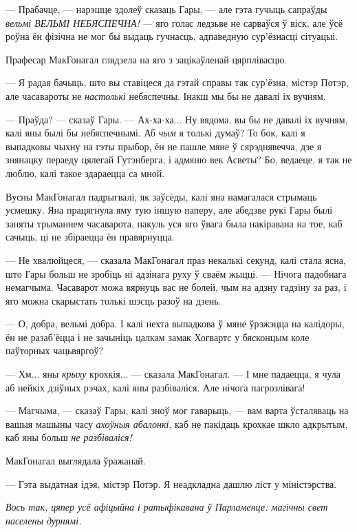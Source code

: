 --- Прабачце, --- нарэшце здолеў сказаць Гары, --- але гэта гучыць сапраўды 
\emph{вельмі ВЕЛЬМІ НЕБЯСПЕЧНА!} --- яго голас ледзьве не сарваўся ў віск, але ўсё роўна
ён фізічна не мог бы выдаць гучнасць, адпаведную сур'ёзнасці сітуацыі.

Прафесар МакГонагал глядзела на яго з зацікаўленай цярплівасцю.

--- Я радая бачыць, што вы ставіцеся да гэтай справы так сур'ёзна, містэр Потэр,
але часавароты не  \emph{настолькі} небяспечны. Інакш мы бы не давалі іх вучням.

--- Праўда? --- сказаў Гары. --- Ах-ха-ха... Ну вядома, вы бы не давалі іх вучням,
калі яны былі бы небяспечнымі. Аб \emph{чым} я толькі думаў? То бок, калі я выпадковы чыхну на 
гэты прыбор, ён не пашле мяне ў сярэднявечча, дзе я знянацку пераеду цялегай Гутэнберга,
і адмяню век Асветы? Бо, ведаеце, я так не люблю, калі такое здараецца са мной.

Вусны МакГонагал падрыгвалі, як заўсёды, калі яна намагалася стрымаць усмешку. 
Яна працягнула яму тую іншую паперу, але абедзве рукі Гары былі заняты трыманнем 
часаварота, пакуль уся яго ўвага была накіравана на тое, каб сачыць, ці не 
збіраецца ён правярнуцца.

--- Не хвалюйцеся, --- сказала МакГонагал праз некалькі секунд, калі стала ясна, 
што Гары больш не зробіць ні адзінага руху ў сваём жыцці. --- Нічога падобнага 
немагчыма. Часаварот можа вярнуць вас не болей, чым на адзну гадзіну за раз, і яго 
можна скарыстать толькі шэсць разоў на дзень. 

--- О, добра, вельмі добра. І калі нехта выпадкова ў мяне ўрэжэцца на калідоры,
ён не разаб'ёцца і не зачыніць цалкам замак Хогвартс у бясконцым коле паўторных
чацьвяргоў?

--- Хм... яны \emph{крыху} крохкія... --- сказала МакГонагал. --- І мне падаецца,
я чула аб нейкіх дзіўных рэчах, калі яны разбіваліся. Але нічога пагрозлівага!

--- Магчыма, --- сказаў Гары, калі зноў мог гаварыць, --- вам варта ўсталяваць 
на вашыя машыны часу \emph{ахоўныя абалонкі}, каб не пакідаць крохкае шкло 
адкрытым, каб яны больш \emph{не разбіваліся!}

МакГонагал выглядала ўражанай.

--- Гэта выдатная ідэя, містэр Потэр. Я неадкладна дашлю ліст у міністэрства.

\emph{Вось так, цяпер усё афіцыйна і ратыфікавана ў Парламенце: магічны свет населены
дурнямі.}

